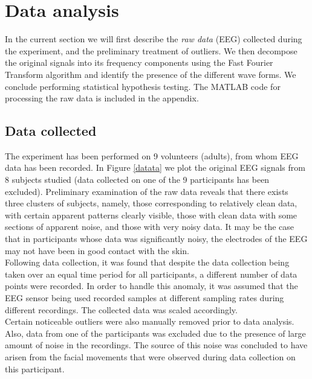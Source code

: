 \documentclass[twocolumn,superscriptaddress]{revtex4-1}
\theoremstyle{definition}
\theoremstyle{remark}
\begin{document}
\section{Data analysis}  \label{stat}%

In the current section we will first describe the \textit{raw data} (EEG) collected during the experiment, and the preliminary treatment of outliers. We then decompose the original signals into its frequency components using the Fast Fourier Transform algorithm and identify the presence of the different wave forms. We conclude performing statistical hypothesis testing. The MATLAB code for processing the raw data is included in the appendix. \\


\subsection{Data collected}

The experiment has been performed on 9 volunteers (adults), from whom EEG data has been recorded. In Figure \ref{datata} we plot the original EEG signals from 8 subjects studied (data collected on one of the 9 participants has been excluded). Preliminary examination of the raw data reveals that there exists three clusters of subjects, namely, those corresponding to relatively clean data, with certain apparent patterns clearly visible, those with clean data with some sections of apparent noise, and those with very noisy data. It may be the case that in participants whose data was significantly noisy, the electrodes of the EEG may not have been in good contact with the skin. \\
Following data collection, it was found that despite the data collection being taken over an equal time period for all participants, a different number of data points were recorded.  In order to handle this anomaly, it was assumed that the EEG sensor being used recorded samples at different sampling rates during different recordings. The collected data was scaled accordingly.\\
Certain noticeable outliers were also manually removed prior to data analysis. Also, data from one of the participants was excluded due to the presence of large amount of noise in the recordings. The source of this noise was concluded to have arisen from the facial movements that were observed during data collection on this participant.\\
 
\end{document}
